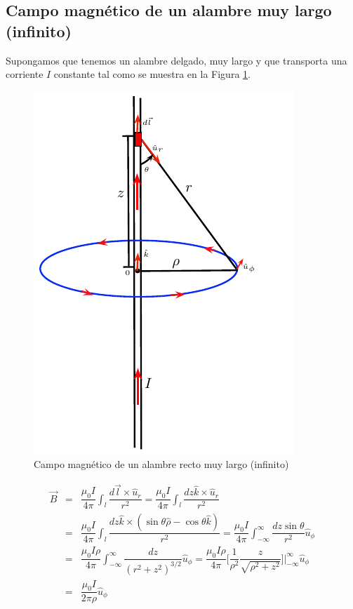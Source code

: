 \subsection*{Campo magnético de un alambre muy largo (infinito)}
Supongamos que tenemos un alambre delgado, muy largo y que transporta una corriente $I$ constante tal como se muestra en la Figura \ref{fig-alambreinfinito}.

\begin{figure}
\begin{center}
\includegraphics[scale=0.8]{magnetostatica/alambreinfinito}
\end{center}
\caption{Campo magnético de un alambre recto muy largo (infinito)}
\label{fig-alambreinfinito}
\end{figure}

\begin{eqnarray}
\nonumber
\vec{B}&=&\dfrac{\mu_0 I}{4\pi}\int_l \dfrac{d\vec{l} \times \hat{u}_r}{r^2} 
=\dfrac{\mu_0 I}{4\pi}\int_l \dfrac{dz\hat{k} \times \hat{u}_r}{r^2} \\ \nonumber
&=&\dfrac{\mu_0 I}{4\pi}\int_l \dfrac{dz\hat{k} \times (\sin\theta\hat{\rho} - \cos\theta \hat{k})}{r^2} 
=\dfrac{\mu_0 I}{4\pi}\int_{-\infty}^{\infty}\dfrac{dz\sin\theta }{r^2}\hat{u}_{\phi} \\ \nonumber
&=&\dfrac{\mu_0 I \rho }{4\pi}\int_{-\infty}^{\infty}\dfrac{dz }{(r^{2}+z^{2})^{3/2}}\hat{u}_{\phi} 
=\dfrac{\mu_0 I \rho }{4\pi}\Big[\dfrac{1}{\rho^{2}}\dfrac{z}{\sqrt{\rho^{2}+z^{2}}}\Big]\Big|_{-\infty}^{\infty} \hat{u}_{\phi} \\
&=&\dfrac{\mu_0 I}{2\pi\rho}\hat{u}_{\phi}
\end{eqnarray}

